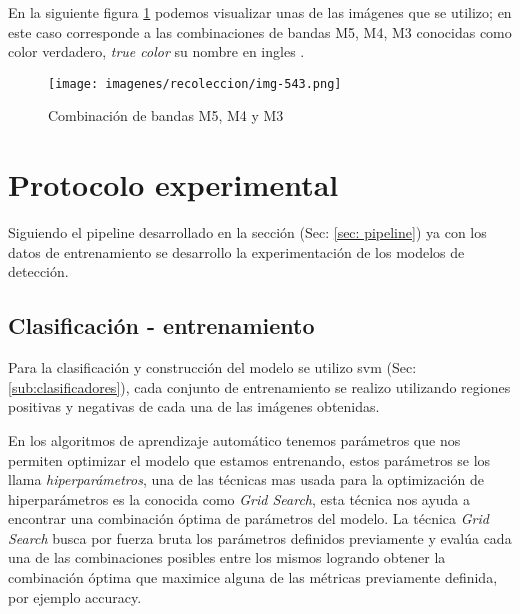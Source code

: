 En la siguiente figura \ref{Fig: bandas543} podemos visualizar unas de las imágenes que se utilizo; en este caso corresponde  a las combinaciones de bandas M5, M4, M3 conocidas como color verdadero, \textit{true color} su nombre en ingles .

\begin{figure}[H]
 \centering
  \texttt{[image: imagenes/recoleccion/img-543.png]}
  \caption{Combinación de bandas M5, M4 y M3}
	\label{Fig: bandas543}
\end{figure}



\section{Protocolo experimental}\label{sec:entrenamiento}

Siguiendo el pipeline desarrollado en la sección (Sec: \ref{sec: pipeline}) ya con los datos de entrenamiento se desarrollo la experimentación de los modelos de detección.

\subsection*{Clasificación - entrenamiento}\label{sub:entr_class}

Para la clasificación y construcción del modelo se utilizo \ac{svm} (Sec: \ref{sub:clasificadores}), cada conjunto de entrenamiento se realizo utilizando regiones positivas y negativas de cada una de las imágenes obtenidas.

En los algoritmos de aprendizaje automático tenemos parámetros que nos permiten optimizar el modelo que estamos entrenando, estos  parámetros se los llama \textit{hiperparámetros}, una de las técnicas mas usada para la optimización de hiperparámetros es la conocida como \textit{Grid Search}, esta técnica nos ayuda a encontrar una combinación óptima de parámetros del modelo. La técnica \textit{Grid Search} busca por fuerza bruta los parámetros definidos previamente y evalúa cada una de las combinaciones posibles entre los mismos logrando obtener la combinación óptima que maximice alguna de las métricas previamente definida, por ejemplo accuracy. 

